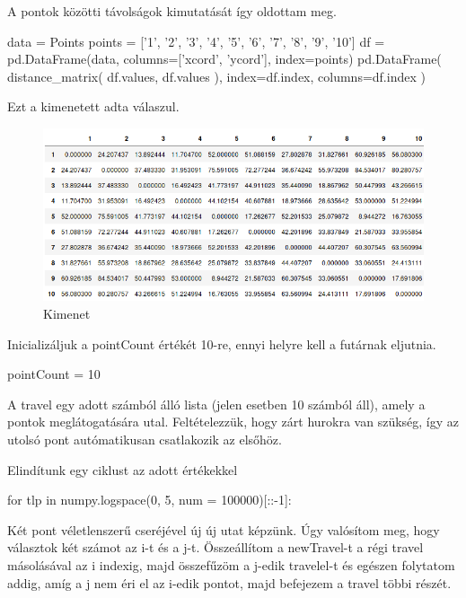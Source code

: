 A pontok közötti távolságok kimutatását így oldottam meg.

\begin{python}
data = Points
points = ['1', '2', '3', '4', '5', '6', '7', '8', '9', '10']
df = pd.DataFrame(data, columns=['xcord', 'ycord'], index=points)
pd.DataFrame(
	distance_matrix(
		df.values, 
		df.values
	), 
	index=df.index,
	columns=df.index
)
\end{python}

Ezt a kimenetett adta válaszul.

\begin{figure}[h!]
\centering
\includegraphics[width=\textwidth]{images/table.png}
\caption{Kimenet}
\label{fig:kimenet}
\end{figure}

Inicializáljuk a pointCount értékét 10-re, ennyi helyre kell a futárnak eljutnia.

\begin{python}
pointCount = 10
\end{python}

A travel egy adott számból álló lista (jelen esetben 10 számból áll), amely a pontok meglátogatására utal. Feltételezzük, hogy zárt hurokra van szükség, így az utolsó pont autómatikusan csatlakozik az elsőhöz.


\begin{python}
travel = random.sample(range(pointCount), pointCount);}
\end{python}

Elindítunk egy ciklust az adott értékekkel


\begin{python}
for tlp in numpy.logspace(0, 5, num = 100000)[::-1]:
\end{python}


Két pont véletlenszerű cseréjével új új utat képzünk. Úgy valósítom meg, hogy választok két számot az i-t és a j-t. Összeállítom a newTravel-t a régi travel másolásával az i indexig, majd összefűzöm a j-edik travelel-t és egészen folytatom addig, amíg a j nem éri el az i-edik pontot, majd befejezem a travel többi részét.


